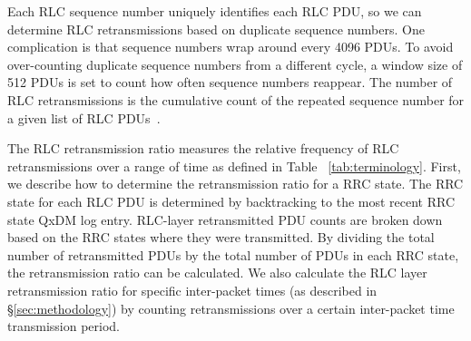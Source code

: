 
Each RLC sequence number uniquely identifies each RLC PDU, so we can determine RLC retransmissions based on duplicate sequence numbers.  One complication is that sequence numbers wrap around every 4096 PDUs.  To avoid over-counting duplicate sequence numbers from a different cycle, a window size of 512 PDUs is set to count how often sequence numbers reappear. The number of RLC retransmissions is the cumulative count of the repeated sequence number for a given list of RLC PDUs~\cite{spec-3G-RLC}.

The RLC retransmission ratio measures the relative frequency of RLC retransmissions over a range of time as defined in Table ~\ref{tab:terminology}. First, we describe how to determine the retransmission ratio for a RRC state. The RRC state for each RLC PDU is determined by backtracking to the most recent RRC state QxDM log entry. RLC-layer retransmitted PDU counts are broken down based on the RRC states where they were transmitted. By dividing the total number of retransmitted PDUs by the total number of PDUs in each RRC state, the retransmission ratio can be calculated. We also calculate the RLC layer retransmission ratio for specific inter-packet times (as described in \S\ref{sec:methodology}) by  counting retransmissions over a certain inter-packet time transmission period.

